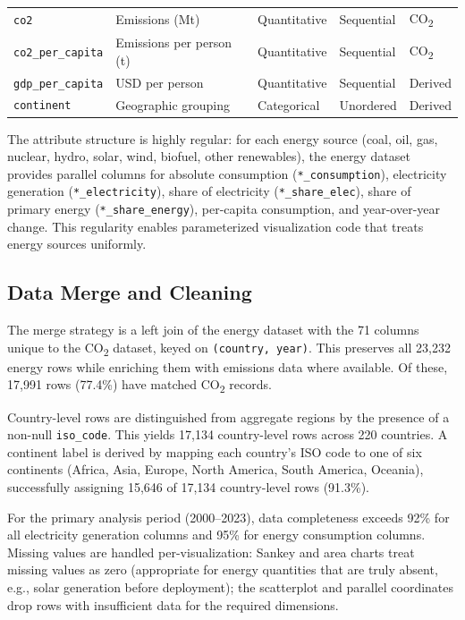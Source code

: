 \documentclass[10pt]{article}
\begin{document}
\begin{table}[h]
\begin{center}
\begin{tabular}{lllll}
\texttt{co2} & Emissions (Mt) & Quantitative & Sequential & CO\textsubscript{2} \\
\texttt{co2\_per\_capita} & Emissions per person (t) & Quantitative & Sequential & CO\textsubscript{2} \\
\texttt{gdp\_per\_capita} & USD per person & Quantitative & Sequential & Derived \\
\texttt{continent} & Geographic grouping & Categorical & Unordered & Derived \\
\bottomrule
\end{tabular}
\end{center}
\end{table}

The attribute structure is highly regular: for each energy source (coal, oil, gas, nuclear, hydro, solar, wind, biofuel, other renewables), the energy dataset provides parallel columns for absolute consumption (\texttt{*\_consumption}), electricity generation (\texttt{*\_electricity}), share of electricity (\texttt{*\_share\_elec}), share of primary energy (\texttt{*\_share\_energy}), per-capita consumption, and year-over-year change. This regularity enables parameterized visualization code that treats energy sources uniformly.

\subsection{Data Merge and Cleaning}

The merge strategy is a left join of the energy dataset with the 71 columns unique to the CO\textsubscript{2} dataset, keyed on \texttt{(country, year)}. This preserves all 23{,}232 energy rows while enriching them with emissions data where available. Of these, 17{,}991 rows (77.4\%) have matched CO\textsubscript{2} records.

Country-level rows are distinguished from aggregate regions by the presence of a non-null \texttt{iso\_code}. This yields 17{,}134 country-level rows across 220 countries. A continent label is derived by mapping each country's ISO code to one of six continents (Africa, Asia, Europe, North America, South America, Oceania), successfully assigning 15{,}646 of 17{,}134 country-level rows (91.3\%).

For the primary analysis period (2000--2023), data completeness exceeds 92\% for all electricity generation columns and 95\% for energy consumption columns. Missing values are handled per-visualization: Sankey and area charts treat missing values as zero (appropriate for energy quantities that are truly absent, e.g., solar generation before deployment); the scatterplot and parallel coordinates drop rows with insufficient data for the required dimensions.
\end{document}

